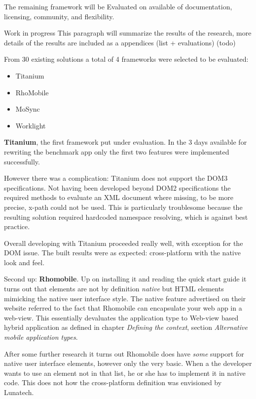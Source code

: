 The remaining framework will be Evaluated on available of documentation, licensing, community, and flexibility.

Work in progress
This paragraph will summarize the results of the research, more details of the results are included as a appendices (list + evaluations) (todo)%

From 30 existing solutions a total of 4 frameworks were selected to be evaluated:
\begin{itemize}
	\item Titanium
	\item RhoMobile
	\item MoSync
	\item Worklight
\end{itemize} 



{\bf Titanium}, the first framework put under evaluation. In the 3 days available for rewriting the benchmark app only the first two features were implemented successfully.

However there was a complication: Titanium does not support the DOM3 specifications. Not having been developed beyond DOM2 specifications the required methods to evaluate an XML document where missing, to be more precise, x-path could not be used. This is particularly troublesome because the resulting solution required hardcoded namespace resolving, which is against best practice. %

Overall developing with Titanium proceeded really well, with exception for the DOM issue. The built results were as expected: cross-platform with the native look and feel.

Second up: {\bf Rhomobile}. Up on installing it and reading the quick start guide it turns out that elements are not by definition \emph{native} but HTML elements mimicking the native user interface style. The native feature advertised on their website referred to the fact that Rhomobile can encapsulate your web app in a web-view. This essentially devaluates the application type to Web-view based hybrid application as defined in chapter \emph{Defining the context}, section \emph{Alternative mobile application types}.

After some further research it turns out Rhomobile does have \emph{some} support for native user interface elements, however only the very basic. When a the developer wants to use an element not in that list, he or she has to implement it in native code. \cite{Rhomobile2012} This does not how the cross-platform definition was envisioned by Lunatech.

